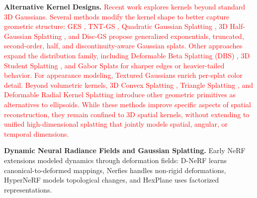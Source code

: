 \documentclass{article} %
\begin{document}
\textbf{Alternative Kernel Designs.}
\textcolor{red}{
Recent work explores kernels beyond standard 3D Gaussians. Several methods modify the kernel shape to better capture geometric structure: GES \citep{hamdi2024gesgeneralizedexponentialsplatting}, TNT-GS \citep{liu2025tnt}, Quadratic Gaussian Splatting \citep{zhang2025quadratic}, 3D Half-Gaussian Splatting \citep{li20253d}, and Disc-GS \citep{qu2024disc} propose generalized exponentials, truncated, second-order, half, and discontinuity-aware Gaussian splats. Other approaches expand the distribution family, including Deformable Beta Splatting (DBS) \citep{liu2025deformable}, 3D Student Splatting \citep{zhu20253dstudentsplattingscooping}, and Gabor Splats \citep{zhou20253dgabsplat3dgaborsplatting} for sharper edges or heavier-tailed behavior. For appearance modeling, Textured Gaussians \citep{chao2025textured} enrich per-splat color detail. Beyond volumetric kernels, 3D Convex Splatting \citep{held20243dconvexsplattingradiance}, Triangle Splatting \citep{held2025triangle}, and Deformable Radial Kernel Splatting \citep{huang2025deformable} introduce other geometric primitives as alternatives to ellipsoids. While these methods improve specific aspects of spatial reconstruction, they remain confined to 3D spatial kernels, without extending to unified high-dimensional splatting that jointly models spatial, angular, or temporal dimensions.
}

\textbf{Dynamic Neural Radiance Fields and Gaussian Splatting.}
Early NeRF extensions modeled dynamics through deformation fields: D-NeRF \citep{pumarola2020dnerfneuralradiancefields} learns canonical-to-deformed mappings, Nerfies \citep{park2021nerfies} handles non-rigid deformations, HyperNeRF \citep{park2021hypernerf} models topological changes, and HexPlane \citep{cao2023hexplane} uses factorized representations.
\end{document}
